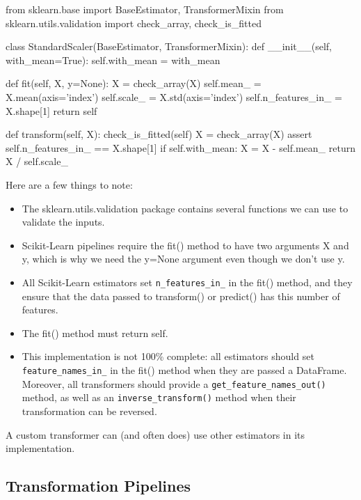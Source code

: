 \begin{pyc}
from sklearn.base import BaseEstimator, TransformerMixin
from sklearn.utils.validation import check_array, check_is_fitted

class StandardScaler(BaseEstimator, TransformerMixin):
    def __init__(self, with_mean=True):
        self.with_mean = with_mean
        
    def fit(self, X, y=None):
        X = check_array(X)
        self.mean_ = X.mean(axis='index')
        self.scale_ = X.std(axis='index')
        self.n_features_in_ = X.shape[1]
        return self

    def transform(self, X):
        check_is_fitted(self)
        X = check_array(X)
        assert self.n_features_in_ == X.shape[1]
        if self.with_mean:
            X = X - self.mean_
        return X / self.scale_
\end{pyc}

Here are a few things to note:
\begin{itemize}
    \item The sklearn.utils.validation package contains several functions we can use to validate the inputs.
    \item Scikit-Learn pipelines require the fit() method to have two arguments X and y,
    which is why we need the y=None argument even though we don't use y.
    \item All Scikit-Learn estimators set \verb|n_features_in_| in the fit() method, and they
    ensure that the data passed to transform() or predict() has this number of
    features.
    \item The fit() method must return self.

    \item This implementation is not 100\% complete: all estimators should set
    \verb|feature_names_in_| in the fit() method when they are passed a DataFrame.
    Moreover, all transformers should provide a \verb|get_feature_names_out()| method,
    as well as an \verb|inverse_transform()| method when their transformation can be
    reversed.
\end{itemize}

A custom transformer can (and often does) use other estimators in its implementation.


\subsection{Transformation Pipelines}